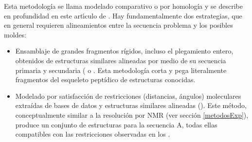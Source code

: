 Esta metodolog\'{i}a se llama modelado comparativo o por homolog\'{i}a y se describe en profundidad en este
art\'\i{}culo de \citet{Fiser2003}. %
Hay fundamentalmente dos estrategias, que en general requieren alineamientos entre la secuencia problema y los posibles moldes:
\begin{itemize}

\item Ensamblaje de grandes fragmentos r\'{i}gidos, incluso el plegamiento entero, 
obtenidos de estructuras similares alineadas por medio de su secuencia primaria y secundaria
( o
.
Esta metodolog\'{i}a corta y pega literalmente fragmentos del esqueleto pept\'{i}dico de estructuras conocidas.

\item Modelado por satisfacci\'{o}n de restricciones (distancias, \'{a}ngulos) moleculares extra\'{i}das 
de bases de datos y estructuras similares alineadas (). 
Este m\'{e}todo, conceptualmente similar a la resoluci\'{o}n por NMR (ver secci\'{o}n \ref{metodosExp}), 
produce un conjunto de estructuras para la secuencia A, 
todas ellas compatibles con las restricciones observadas en los .

\end{itemize}

